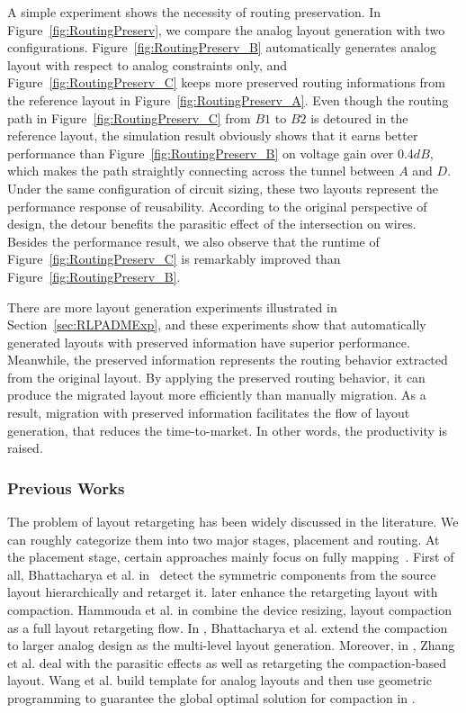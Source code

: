       A simple experiment shows the necessity of routing preservation. In Figure~\ref{fig:RoutingPreserv}, we compare the analog layout generation with two configurations. Figure~\ref{fig:RoutingPreserv_B} automatically generates analog layout with respect to analog constraints only, and Figure~\ref{fig:RoutingPreserv_C} keeps more preserved routing informations from the reference layout in Figure~\ref{fig:RoutingPreserv_A}. Even though the routing path in Figure~\ref{fig:RoutingPreserv_C} from $B1$ to $B2$ is detoured in the reference layout, the simulation result obviously shows that it earns better performance than Figure~\ref{fig:RoutingPreserv_B} on voltage gain over 0.4$dB$, which makes the path straightly connecting across the tunnel between $A$ and $D$. Under the same configuration of circuit sizing, these two layouts represent the performance response of reusability. According to the original perspective of design, the detour benefits the parasitic effect of the intersection on wires. Besides the performance result, we also observe that the runtime of Figure~\ref{fig:RoutingPreserv_C} is remarkably improved than Figure~\ref{fig:RoutingPreserv_B}. 
      
      There are more layout generation experiments illustrated in Section~\ref{sec:RLPADMExp}, and these experiments show that automatically generated layouts with preserved information have superior performance. Meanwhile, the preserved information represents the routing behavior extracted from the original layout. By applying the preserved routing behavior, it can produce the migrated layout more efficiently than manually migration. As a result, migration with preserved information facilitates the flow of layout generation, that reduces the time-to-market. In other words, the productivity is raised.

      \subsubsection{Previous Works}

      The problem of layout retargeting has been widely discussed in the literature. We can roughly categorize them into two major stages, placement and routing. At the placement stage, certain approaches mainly focus on fully mapping~\cite{Bhattacharya_ASPDAC04,cbc-bhattacharya-dac04,msc-bhattacharya-tcad06,Zhang_TCAD08,LayoutRetarg_Liu_ASPDAC2010,Wang_ALRGP_TODAES2011}. First of all, Bhattacharya et al. in~\cite{Bhattacharya_ASPDAC04} detect the symmetric components from the source layout hierarchically and retarget it. \cite{cbc-bhattacharya-dac04} later enhance the retargeting layout with compaction. Hammouda et al. in\cite{cart-hammouda-dac06} combine the device resizing, layout compaction as a full layout retargeting flow. In \cite{msc-bhattacharya-tcad06}, Bhattacharya et al. extend the compaction to larger analog design as the multi-level layout generation. Moreover, in \cite{Zhang_TCAD08}, Zhang et al. deal with the parasitic effects as well as retargeting the compaction-based layout. Wang et al. build template for analog layouts and then use geometric programming to guarantee the global optimal solution for compaction in \cite{Wang_ALRGP_TODAES2011}. 

